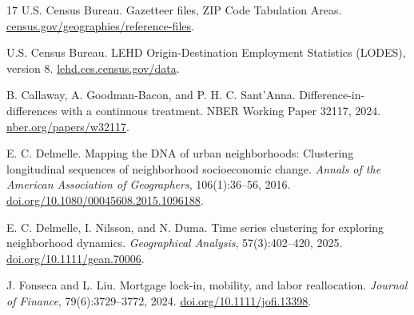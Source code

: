 \documentclass[11pt]{article}
\newcommand{\uGaz}{https://www.census.gov/geographies/reference-files/time-series/geo/gazetteer-files.html}
\newcommand{\uLodes}{https://lehd.ces.census.gov/data/}
\newcommand{\uCall}{https://www.nber.org/papers/w32117}
\newcommand{\uDelm}{https://doi.org/10.1080/00045608.2015.1096188}
\newcommand{\uDelmb}{https://doi.org/10.1111/gean.70006}
\newcommand{\uFons}{https://doi.org/10.1111/jofi.13398}
\begin{document}
\begin{thebibliography}{17}
 U.S. Census Bureau. Gazetteer files, ZIP Code Tabulation
Areas. \href{\uGaz}{census.gov/geographies/reference-files}.

 U.S. Census Bureau. LEHD Origin-Destination Employment Statistics
(LODES), version 8. \href{\uLodes}{lehd.ces.census.gov/data}.

 B. Callaway, A. Goodman-Bacon, and P. H. C. Sant'Anna.
Difference-in-differences with a continuous treatment. NBER Working Paper 32117,
2024. \href{\uCall}{nber.org/papers/w32117}.

 E. C. Delmelle. Mapping the DNA of urban neighborhoods:
Clustering longitudinal sequences of neighborhood socioeconomic change.
\textit{Annals of the American Association of Geographers}, 106(1):36--56, 2016.
\href{\uDelm}{doi.org/10.1080/00045608.2015.1096188}.

 E. C. Delmelle, I. Nilsson, and N. Duma. Time series
clustering for exploring neighborhood dynamics. \textit{Geographical Analysis},
57(3):402--420, 2025. \href{\uDelmb}{doi.org/10.1111/gean.70006}.

 J. Fonseca and L. Liu. Mortgage lock-in, mobility, and labor
reallocation. \textit{Journal of Finance}, 79(6):3729--3772, 2024.
\href{\uFons}{doi.org/10.1111/jofi.13398}.

\end{thebibliography}
\end{document}
